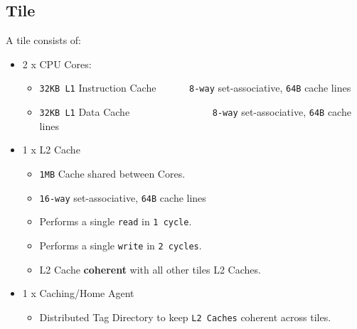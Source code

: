 \documentclass[bsc,frontabs,twoside,singlespacing,parskip,deptreport]{infthesis}     %
\begin{document}
\subsection{Tile}
A tile consists of:
\begin{itemize}
    \item 2 x CPU Cores:
    \begin{itemize}
        \item \texttt{32KB L1} Instruction Cache \ \ \ \ \ \ \texttt{8-way} set-associative, \texttt{64B} cache lines
        \item \texttt{32KB L1} Data Cache \ \ \ \ \ \ \ \ \ \ \ \ \ \ \ \ \texttt{8-way} set-associative, \texttt{64B} cache lines
    \end{itemize}
    
    \item 1 x L2 Cache
    \begin{itemize}
        \item \texttt{1MB} Cache shared between Cores.
        \item \texttt{16-way} set-associative, \texttt{64B} cache lines
        \item Performs a single \texttt{read} in \texttt{1 cycle}.
        \item Performs a single \texttt{write} in \texttt{2 cycles}.
        \item L2 Cache \textbf{coherent} with all other tiles L2 Caches.
    \end{itemize}
    
    \item 1 x Caching/Home Agent
    \begin{itemize}
        \item Distributed Tag Directory to keep \texttt{L2 Caches} coherent across tiles.
    \end{itemize}
\end{itemize}
\end{document}
